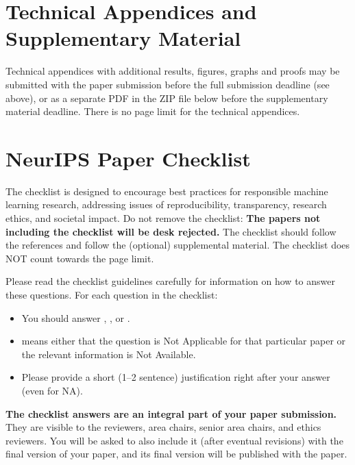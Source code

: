 \documentclass{article}
\begin{document}
\section{Technical Appendices and Supplementary Material}
Technical appendices with additional results, figures, graphs and proofs may be submitted with the paper submission before the full submission deadline (see above), or as a separate PDF in the ZIP file below before the supplementary material deadline. There is no page limit for the technical appendices.


\newpage
\section*{NeurIPS Paper Checklist}

The checklist is designed to encourage best practices for responsible machine learning research, addressing issues of reproducibility, transparency, research ethics, and societal impact. Do not remove the checklist: {\bf The papers not including the checklist will be desk rejected.} The checklist should follow the references and follow the (optional) supplemental material.  The checklist does NOT count towards the page
limit. 

Please read the checklist guidelines carefully for information on how to answer these questions. For each question in the checklist:
\begin{itemize}
    \item You should answer \answerYes{}, \answerNo{}, or \answerNA{}.
    \item \answerNA{} means either that the question is Not Applicable for that particular paper or the relevant information is Not Available.
    \item Please provide a short (1–2 sentence) justification right after your answer (even for NA). 
\end{itemize}

{\bf The checklist answers are an integral part of your paper submission.} They are visible to the reviewers, area chairs, senior area chairs, and ethics reviewers. You will be asked to also include it (after eventual revisions) with the final version of your paper, and its final version will be published with the paper.
\end{document}
